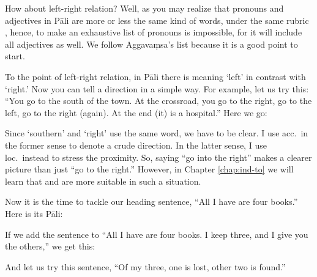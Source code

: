 
How about left-right relation? Well, as you may realize that pronouns and adjectives in P\=ali are more or less the same kind of words, under the same rubric , hence, to make an exhaustive list of pronouns is impossible, for it will include all adjectives as well. We follow Aggava\d msa's list because it is a good point to start.

To the point of left-right relation, in P\=ali there is  meaning `left' in contrast with  `right.' Now you can tell a direction in a simple way. For example, let us try this: ``You go to the south of the town. At the crossroad, you go to the right, go to the left, go to the right (again). At the end (it) is a hospital.'' Here we go:


Since `southern' and `right' use the same word, we have to be clear. I use acc.\ in the former sense to denote a crude direction. In the latter sense, I use loc.\ instead to stress the proximity. So, saying ``go into the right'' makes a clearer picture than just ``go to the right.'' However, in Chapter \ref{chap:ind-to} we will learn that  and  are more suitable in such a situation.

Now it is the time to tackle our heading sentence, ``All I have are four books.'' Here is its P\=ali:


If we add the sentence to ``All I have are four books. I keep three, and I give you the others,'' we get this:


And let us try this sentence, ``Of my three, one is lost, other two is found.''

